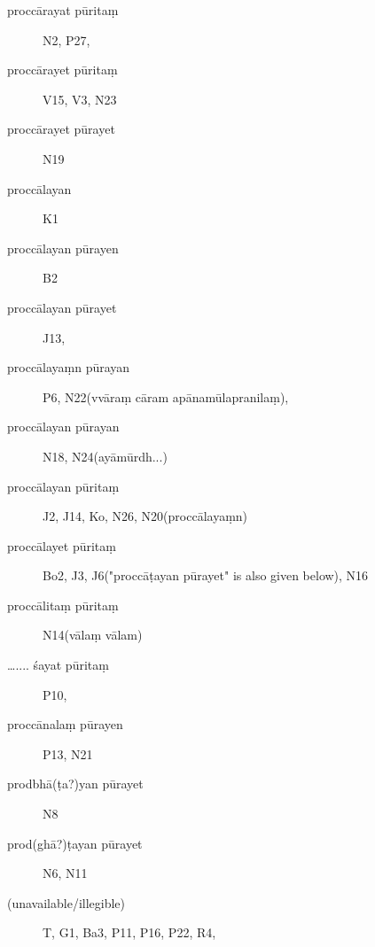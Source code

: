\begin{ekdosis}
\begin{marma}[hp01_048]
\begin{description}
\item[proccārayat pūritaṃ]    N2, P27, 
\item[proccārayet pūritaṃ]    V15, V3, N23
\item[proccārayet pūrayet]    N19
\item[proccālayan]    K1
\item[proccālayan pūrayen]    B2
\item[proccālayan pūrayet]    J13,
\item[proccālayaṃn pūrayan]    P6, N22(vvāraṃ cāram apānamūlapranilaṃ), \item[proccālayan pūrayan]    N18, N24(ayāmūrdh...)
\item[proccālayan pūritaṃ]    J2, J14, Ko, N26, N20(proccālayaṃn)
\item[proccālayet pūritaṃ]    Bo2, J3, J6("proccāṭayan pūrayet" is also given below), N16
\item[proccālitaṃ pūritaṃ]    N14(vālaṃ vālam)
\item[….... śayat pūritaṃ]    P10, 
\item[proccānalaṃ pūrayen]   P13, N21
\item[prodbhā(ṭa?)yan pūrayet]    N8
\item[prod(ghā?)ṭayan pūrayet]    N6, N11
\item[(unavailable/illegible)] T, G1, Ba3, P11, P16, P22, R4, 


\end{description}
\end{marma}
\end{ekdosis}
